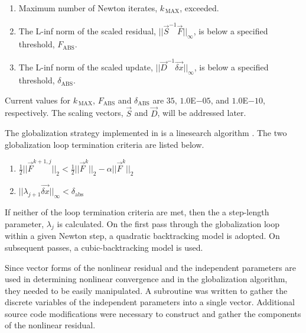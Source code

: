 \begin{enumerate}
\item{Maximum number of Newton iterates, $k_{\,\text{MAX}}$, exceeded.}
\item{The L-inf norm of the scaled residual, $||\vec{S}^{-1}\vec{F}||_{\infty}$, is below a specified threshold, $F_{\text{ABS}}$.}
\item{The L-inf norm of the scaled update, $||\vec{D}^{-1}\vec{\delta x}||_{\infty}$, is below a specified threshold, $\delta_{\text{ABS}}$.}
\end{enumerate}

Current values for $k_{\,\text{MAX}}$, $F_{\text{ABS}}$ and $\delta_{\text{ABS}}$ are $35$, $1.0$E$-05$, and $1.0$E$-10$, respectively.
The scaling vectors, $\vec{S}$ and $\vec{D}$, will be addressed later.

The globalization strategy implemented in \cobra{} is a linesearch algorithm \cite{Dennis1996}.
The two globalization loop termination criteria are listed below.

\begin{enumerate}
\item{$\frac{1}{2}||\vec{F}^{k+1, j}||_{2} < \frac{1}{2}||\vec{F}^{k}||_{2} - \alpha ||\vec{F}^{k}||_{2}$ }
\item{$||\lambda_{j+1} \vec{\delta x}||_{\infty} < \delta_{\text{abs}}$}
\end{enumerate}

If neither of the loop termination criteria are met, then the a step-length parameter, $\lambda_j$ is calculated.
On the first pass through the globalization loop within a given Newton step, a quadratic backtracking model is adopted.
On subsequent passes, a cubic-backtracking model is used.
 
Since vector forms of the nonlinear residual and the independent parameters are used in determining nonlinear convergence and in the globalization algorithm, they needed to be easily manipulated.
A subroutine was written to gather the discrete variables of the independent parameters into a single vector.
Additional source code modifications were necessary to construct and gather the components of the nonlinear residual.

